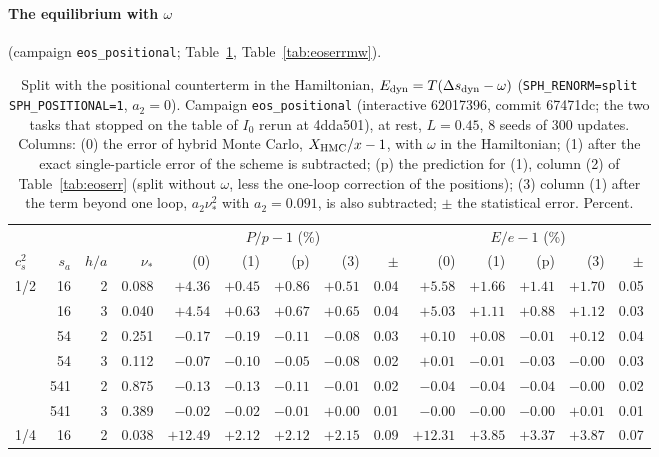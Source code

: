 \documentclass[11pt,aps,preprint,nofootinbib,superscriptaddress,tightenlines]{revtex4-2}
\def\Tab#1{Table~\ref{#1}}
\let\oldparagraph\paragraph
\renewcommand{\paragraph}{\par\bigskip\oldparagraph}
\begin{document}
\paragraph{The equilibrium with $\omega$} (campaign \texttt{eos\_positional}; \Tab{tab:eoserrsw}, \Tab{tab:eoserrmw}).
\begin{table}[h]
\caption{Split with the positional counterterm in the Hamiltonian, $E_{\rm dyn}=T(\Delta s_{\rm dyn}-\omega)$ (\texttt{SPH\_RENORM=split SPH\_POSITIONAL=1}, $a_2=0$).  Campaign \texttt{eos\_positional} (interactive 62017396, commit 67471dc; the two tasks that stopped on the table of $I_0$ rerun at 4dda501), at rest, $L=0.45$, 8 seeds of 300 updates.  Columns: (0) the error of hybrid Monte Carlo, $X_{\rm HMC}/x-1$, with $\omega$ in the Hamiltonian; (1) after the exact
single-particle error of the scheme is subtracted; (p) the prediction for (1), column (2) of \Tab{tab:eoserr} (split without $\omega$, less the one-loop
correction of the positions); (3) column (1) after the term beyond one loop, $a_2\nu_*^2$ with $a_2=0.091$, is also subtracted; $\pm$ the
statistical error.  Percent.}
\label{tab:eoserrsw}
\begin{center}\small
\begin{tabular}{lrrr|rrrrr|rrrrr}
\toprule
 & & & & \multicolumn{5}{c|}{$P/p-1$ (\%)} & \multicolumn{5}{c}{$E/e-1$ (\%)} \\
$c_s^2$ & $s_a$ & $h/a$ & $\nu_*$ & (0) & (1) & (p) & (3) & $\pm$ & (0) & (1) & (p) & (3) & $\pm$ \\
\midrule
1/2 & 16 & 2 & 0.088 & $+4.36$ & $+0.45$ & $+0.86$ & $+0.51$ & 0.04 & $+5.58$ & $+1.66$ & $+1.41$ & $+1.70$ & 0.05 \\
 & 16 & 3 & 0.040 & $+4.54$ & $+0.63$ & $+0.67$ & $+0.65$ & 0.04 & $+5.03$ & $+1.11$ & $+0.88$ & $+1.12$ & 0.03 \\
 & 54 & 2 & 0.251 & $-0.17$ & $-0.19$ & $-0.11$ & $-0.08$ & 0.03 & $+0.10$ & $+0.08$ & $-0.01$ & $+0.12$ & 0.04 \\
 & 54 & 3 & 0.112 & $-0.07$ & $-0.10$ & $-0.05$ & $-0.08$ & 0.02 & $+0.01$ & $-0.01$ & $-0.03$ & $-0.00$ & 0.03 \\
 & 541 & 2 & 0.875 & $-0.13$ & $-0.13$ & $-0.11$ & $-0.01$ & 0.02 & $-0.04$ & $-0.04$ & $-0.04$ & $-0.00$ & 0.02 \\
 & 541 & 3 & 0.389 & $-0.02$ & $-0.02$ & $-0.01$ & $+0.00$ & 0.01 & $-0.00$ & $-0.00$ & $-0.00$ & $+0.01$ & 0.01 \\
\midrule
1/4 & 16 & 2 & 0.038 & $+12.49$ & $+2.12$ & $+2.12$ & $+2.15$ & 0.09 & $+12.31$ & $+3.85$ & $+3.37$ & $+3.87$ & 0.07 \\

\end{tabular}
\end{center}
\end{table}
\end{document}
